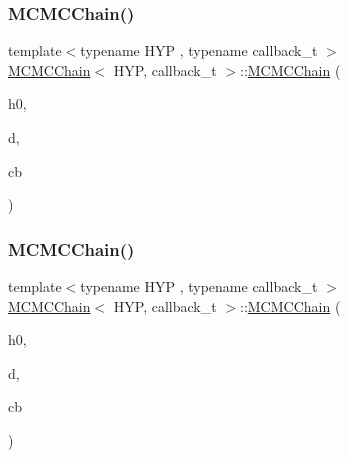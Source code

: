 \subsubsection{\texorpdfstring{M\+C\+M\+C\+Chain()}{MCMCChain()}\hspace{0.1cm}{\footnotesize\ttfamily [1/6]}}
{\footnotesize\ttfamily template$<$typename H\+YP , typename callback\+\_\+t $>$ \\
\hyperlink{class_m_c_m_c_chain}{M\+C\+M\+C\+Chain}$<$ H\+YP, callback\+\_\+t $>$\+::\hyperlink{class_m_c_m_c_chain}{M\+C\+M\+C\+Chain} (\begin{DoxyParamCaption}\item[{H\+YP \&}]{h0,  }\item[{typename H\+Y\+P\+::t\+\_\+data $\ast$}]{d,  }\item[{callback\+\_\+t \&}]{cb }\end{DoxyParamCaption})\hspace{0.3cm}{\ttfamily [inline]}}

\mbox{\label{class_m_c_m_c_chain_ac75dc993bdc19b193ef6f128d62f8208}} 
\subsubsection{\texorpdfstring{M\+C\+M\+C\+Chain()}{MCMCChain()}\hspace{0.1cm}{\footnotesize\ttfamily [2/6]}}
{\footnotesize\ttfamily template$<$typename H\+YP , typename callback\+\_\+t $>$ \\
\hyperlink{class_m_c_m_c_chain}{M\+C\+M\+C\+Chain}$<$ H\+YP, callback\+\_\+t $>$\+::\hyperlink{class_m_c_m_c_chain}{M\+C\+M\+C\+Chain} (\begin{DoxyParamCaption}\item[{H\+YP \&\&}]{h0,  }\item[{typename H\+Y\+P\+::t\+\_\+data $\ast$}]{d,  }\item[{callback\+\_\+t \&}]{cb }\end{DoxyParamCaption})\hspace{0.3cm}{\ttfamily [inline]}}

\mbox{\label{class_m_c_m_c_chain_a60ef818850d6836a21169d6e9bc14221}} 
